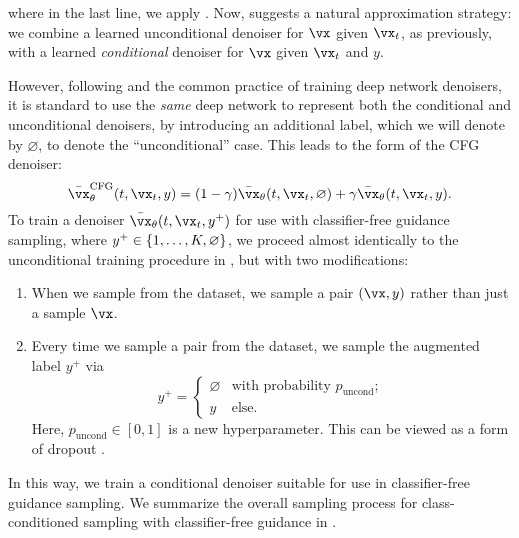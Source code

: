 \documentclass[../../book-main.tex]{subfiles}
\begin{document}
where in the last line, we apply
.
Now,  suggests a natural approximation strategy: we
combine a learned unconditional denoiser for $\vx$ given $\vx_t$, as previously,
with a learned \textit{conditional} denoiser for $\vx$ given $\vx_t$ and $y$.


However, following \textcite{Ho2022-ry} and the common practice of training deep network
denoisers, it is standard to use the \textit{same} deep network to represent
both the conditional and unconditional denoisers, by introducing an additional
label, which we will denote by $\varnothing$, to denote the ``unconditional''
case.
This leads to the form of the CFG denoiser:
\begin{equation}\label{eq:conditional-denoising-mmse-denoiser-paired-data-approx-cfg}
  \bar{\vx}_{\theta}^{\mathrm{CFG}}(t, \vx_t, y)
  =
  (1 - \gamma) \bar{\vx}_{\theta}(t, \vx_t, \varnothing)
  +
  \gamma \bar{\vx}_{\theta}(t, \vx_t, y).
\end{equation}
To train a denoiser $\bar{\vx}_{\theta}(t, \vx_t, y^+)$ for use with
classifier-free guidance sampling, where $y^+ \in
\set{1, \dots, K, \varnothing}$, we proceed almost identically to the
unconditional training procedure in , but with two
modifications:
\begin{enumerate}
  \item When we sample from the dataset, we sample a pair $(\vx, y)$ rather than
    just a sample $\vx$.
  \item Every time we sample a pair from the dataset, we sample the augmented
    label $y^+$ via
    \begin{equation}
      y^+ = \begin{cases}
        \varnothing & \text{with probability } p_{\mathrm{uncond}}; \\
        y & \text{else}.
      \end{cases}
    \end{equation}
    Here, $p_{\mathrm{uncond}} \in [0, 1]$ is a new hyperparameter.
    This can be viewed as a form of dropout \cite{srivastava2014dropout}.
\end{enumerate}
In this way, we train a conditional denoiser suitable for use in classifier-free
guidance sampling. We summarize the overall sampling process for
class-conditioned sampling with classifier-free guidance in
.
\end{document}
